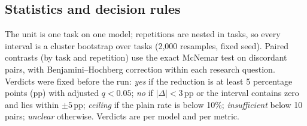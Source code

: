 \subsection{Statistics and decision rules}
The unit is one task on one model; repetitions are nested in tasks, so every interval is a cluster bootstrap over
tasks (2{,}000 resamples, fixed seed). Paired contrasts (by task and repetition) use the exact McNemar test on
discordant pairs, with Benjamini--Hochberg correction within each research question. Verdicts were fixed before
the run: \emph{yes} if the reduction is at least 5 percentage points (pp) with adjusted $q<0.05$; \emph{no} if
$|\Delta|<3$\,pp or the interval contains zero and lies within $\pm5$\,pp; \emph{ceiling} if the plain rate is
below 10\%; \emph{insufficient} below 10 pairs; \emph{unclear} otherwise. Verdicts are per model and per metric.

